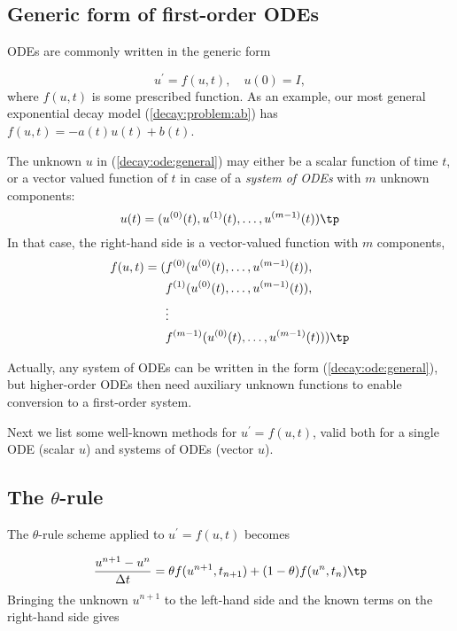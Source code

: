 \documentclass[graybox,sectrefs,envcountresetchap,open=right,final]{svmonodo}
\begin{document}
\subsection{Generic form of first-order ODEs}

ODEs are commonly written in the generic form

\begin{equation}
u^{\prime} = f(u,t),\quad u(0)=I,
\label{decay:ode:general}
\end{equation}
where $f(u,t)$  is some prescribed function.
As an example, our most
general exponential decay model (\ref{decay:problem:ab}) has
$f(u,t)=-a(t)u(t) + b(t)$.

The unknown $u$ in (\ref{decay:ode:general}) may either be
a scalar function of time $t$, or a vector valued function of $t$ in
case of a \emph{system of ODEs} with $m$ unknown components:
\[ u(t) = (u^{(0)}(t),u^{(1)}(t),\ldots,u^{(m-1)}(t)) \tp  \]
In that case, the right-hand side is a vector-valued function with $m$
components,
\begin{align*}
f(u, t) = ( & f^{(0)}(u^{(0)}(t),\ldots,u^{(m-1)}(t)),\\ 
            & f^{(1)}(u^{(0)}(t),\ldots,u^{(m-1)}(t)),\\ 
            & \vdots\\ 
            & f^{(m-1)}(u^{(0)}(t),\ldots,u^{(m-1)}(t)))
\tp
\end{align*}

Actually, any system of ODEs can
be written in the form (\ref{decay:ode:general}), but higher-order
ODEs then need auxiliary unknown functions to enable conversion to
a first-order system.

Next we list some well-known methods for $u^{\prime}=f(u,t)$, valid both for
a single ODE (scalar $u$) and systems of ODEs (vector $u$).

\subsection{The $\theta$-rule}

The $\theta$-rule scheme applied to $u^{\prime}=f(u,t)$ becomes

\begin{equation}
\frac{u^{n+1}-u^n}{\Delta t} = \theta f(u^{n+1},t_{n+1}) +
(1-\theta)f(u^n, t_n)\tp
\label{decay:fd2:theta}
\end{equation}
Bringing the unknown $u^{n+1}$ to the left-hand side and the known terms
on the right-hand side gives
\end{document}

